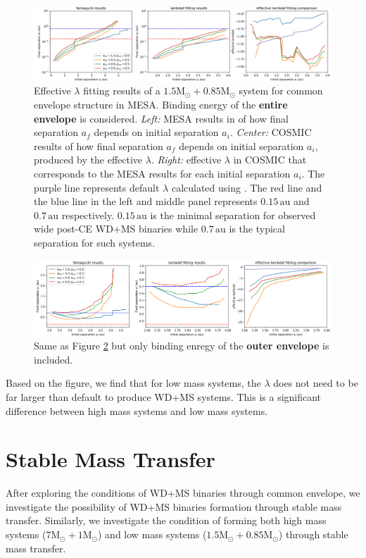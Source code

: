\documentclass[12pt]{article}
\newcommand{\Msun}{\mathrm{M_{\odot}}}
\newcommand{\au}{\, \mathrm{au}}
\begin{document}
\begin{figure}
    \centering
    \includegraphics[width=\linewidth]{1.5+0.8cmp_whole.png}
    \caption{Effective $\lambda$ fitting results of a $1.5\Msun + 0.85\Msun$ system for common envelope structure in MESA. Binding energy of the \textbf{entire envelope} is considered. \emph{Left:} MESA results in \cite{yamaguchi_lo} of how final separation $a_f$ depends on initial separation $a_i$. \emph{Center:} COSMIC results of how final separation $a_f$ depends on initial separation $a_i$, produced by the effective $\lambda$. \emph{Right:} effective $\lambda$ in COSMIC that corresponds to the MESA results for each initial separation $a_i$. The purple line represents default $\lambda$ calculated using \cite{claeys2014theoretical}. The red line and the blue line in the left and middle panel represents $0.15 \au$ and $0.7 \au$ respectively. $0.15 \au$ is the minimal separation for observed wide post-CE WD+MS binaries while $0.7 \au$ is the typical separation for such systems.}
    \label{fit_cmp_lo_whole}
\end{figure}

\begin{figure}
    \centering
    \includegraphics[width=\linewidth]{1.5+0.8cmp_pt.png}
    \caption{Same as Figure \ref{fit_cmp_lo_pt} but only binding enregy of the \textbf{outer envelope} is included.}
    \label{fit_cmp_lo_pt}
\end{figure}

Based on the figure, we find that for low mass systems, the $\lambda$ does not need to be far larger than default to produce WD+MS systems. This is a significant difference between high mass systems and low mass systems.

\section{Stable Mass Transfer}
After exploring the conditions of WD+MS binaries through common envelope, we investigate the possibility of WD+MS binaries formation through stable mass transfer. Similarly, we investigate the condition of forming both high mass systems ($7\Msun + 1\Msun$) and low mass systems ($1.5\Msun + 0.85\Msun$) through stable mass transfer.
\end{document}
